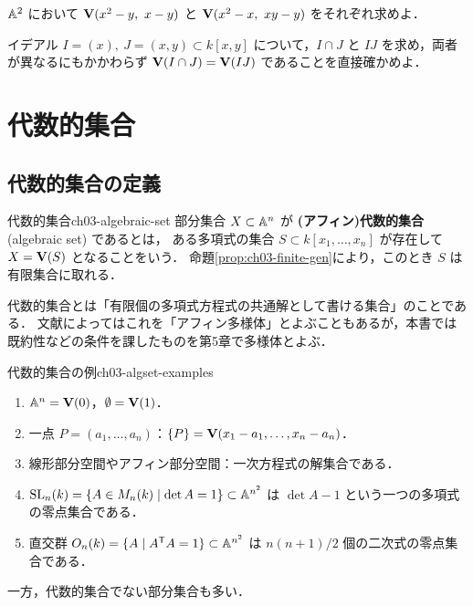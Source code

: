  $\mathbb{A}^2$ において $\mathbf{V}(x^2-y,\ x-y)$ と $\mathbf{V}(x^2-x,\ xy-y)$ をそれぞれ求めよ．

 イデアル $I=(x),\ J=(x,y)\subset k[x,y]$ について，$I\cap J$ と $IJ$ を求め，両者が異なるにもかかわらず $\mathbf{V}(I\cap J)=\mathbf{V}(IJ)$ であることを直接確かめよ．

\section{代数的集合}
\label{sec:ch03-algset}

\subsection{代数的集合の定義}

\begin{mydef}{代数的集合}{ch03-algebraic-set}
部分集合 $X\subset\mathbb{A}^n$ が \textbf{(アフィン)代数的集合} (algebraic set) であるとは，
ある多項式の集合 $S\subset k[x_1,\dots,x_n]$ が存在して $X=\mathbf{V}(S)$ となることをいう．
命題\ref{prop:ch03-finite-gen}により，このとき $S$ は有限集合に取れる．
\end{mydef}

代数的集合とは「有限個の多項式方程式の共通解として書ける集合」のことである．
文献によってはこれを「アフィン多様体」とよぶこともあるが，本書では既約性などの条件を課したものを第5章で多様体とよぶ．

\begin{myex}{代数的集合の例}{ch03-algset-examples}
\begin{enumerate}
  \item $\mathbb{A}^n=\mathbf{V}(0)$，$\emptyset=\mathbf{V}(1)$．
  \item 一点 $P=(a_1,\dots,a_n)$：$\{P\}=\mathbf{V}(x_1-a_1,\dots,x_n-a_n)$．
  \item 線形部分空間やアフィン部分空間：一次方程式の解集合である．
  \item $\operatorname{SL}_n(k)=\{A\in M_n(k)\mid \det A=1\}\subset\mathbb{A}^{n^2}$ は $\det A-1$ という一つの多項式の零点集合である．
  \item 直交群 $O_n(k)=\{A\mid A^{\mathsf T}A=1\}\subset\mathbb{A}^{n^2}$ は $n(n+1)/2$ 個の二次式の零点集合である．
\end{enumerate}
\end{myex}

一方，代数的集合でない部分集合も多い．

